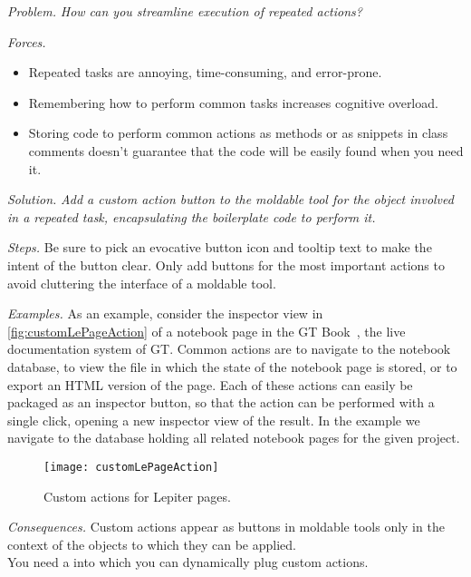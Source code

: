 \documentclass[acmsmall,screen,authorversion,nonacm]{acmart} %
\newcommand\cp[1]{\nbe{Cesare}{#1}{olive}} %
\newcommand{\patref}[1]{\emph{\nameref{pat:#1}}\xspace}
\newcommand{\patsec}[1]{\noindent\textit{#1.}\xspace}
\begin{document}
\patsec{Problem}
\emph{How can you streamline execution of repeated actions?}

\patsec{Forces}
\begin{itemize}[---]
\item Repeated tasks are annoying, time-consuming, and error-prone.
\item Remembering how to perform common tasks increases cognitive overload.
\item Storing code to perform common actions as methods or as snippets in class comments doesn't guarantee that the code will be easily found when you need it.
\end{itemize}

\patsec{Solution}
\emph{Add a custom action button to the moldable tool for the object involved in a repeated task, encapsulating the boilerplate code to perform it.}

\patsec{Steps}
Be sure to pick an evocative button icon and tooltip text to make the intent of the button clear.
Only add buttons for the most important actions to avoid cluttering the interface of a moldable tool.

\patsec{Examples}
As an example, consider the inspector view in \autoref{fig:customLePageAction} of a notebook page in the GT Book~\cite{Girb21a}, the live documentation system of GT.
Common actions are to navigate to the notebook database, to view the file in which the state of the notebook page is stored, or to export an HTML version of the page.
Each of these actions can easily be packaged as an inspector button, so that the action can be performed with a single click, opening a new inspector view of the result.
In the example we navigate to the database holding all related notebook pages for the given project.

\begin{figure}[h]
  \texttt{[image: customLePageAction]}
  \caption{Custom actions for Lepiter pages.}
  \label{fig:customLePageAction}
\end{figure}

\patsec{Consequences}
Custom actions appear as buttons in moldable tools only in the context of the objects to which they can be applied.\\
You need a \patref{MoldableTool} into which you can dynamically plug custom actions.
\end{document}
